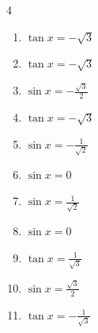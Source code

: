 \begin{multicols}{4}
\begin{enumerate}
  \item $\displaystyle \tan{x}  = -\sqrt{3}$


  \item $\displaystyle \tan{x}  = -\sqrt{3}$


  \item $\displaystyle \sin{x}  = -\frac{\sqrt{3}}{2}$


\columnbreak %

  \item $\displaystyle \tan{x}  = -\sqrt{3}$


  \item $\displaystyle \sin{x}  = -\frac{1}{\sqrt{2}}$


  \item $\displaystyle \sin{x}  = 0$


  \item $\displaystyle \sin{x}  = \frac{1}{\sqrt{2}}$


  \item $\displaystyle \sin{x}  = 0$


  \item $\displaystyle \tan{x}  = \frac{1}{\sqrt{3}}$


  \item $\displaystyle \sin{x}  = \frac{\sqrt{3}}{2}$


  \item $\displaystyle \tan{x}  = -\frac{1}{\sqrt{3}}$



\end{enumerate}
\end{multicols}
